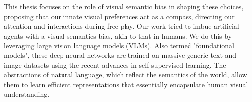 


This thesis focuses on the role of visual semantic bias in shaping these choices, proposing that our innate visual preferences act as a compass, directing our attention and interactions during free play.
Our work tried to imbue artificial agents with a visual semantics bias, akin to that in humans.
We do this by leveraging large vision language models (VLMs).
Also termed "foundational models", these deep neural networks are trained on massive generic text and image datasets using the recent advances in self-supervised learning. 
The abstractions of natural language, which reflect the semantics of the world, allow them to learn efficient representations that essentially encapsulate human visual understanding.

